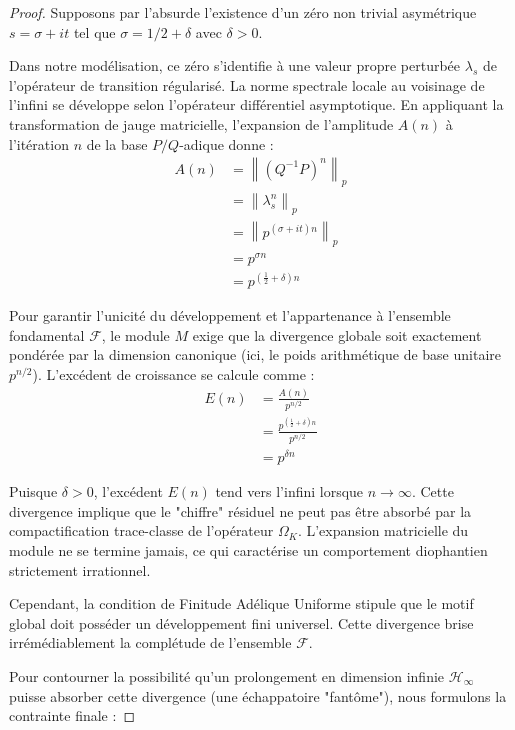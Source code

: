 \documentclass[
]{article}
\begin{document}
\begin{proof}
Supposons par l'absurde l'existence d'un zéro non trivial asymétrique $s = \sigma + it$ tel que $\sigma = 1/2 + \delta$ avec $\delta > 0$.

Dans notre modélisation, ce zéro s'identifie à une valeur propre perturbée $\lambda_s$ de l'opérateur de transition régularisé. La norme spectrale locale au voisinage de l'infini se développe selon l'opérateur différentiel asymptotique. En appliquant la transformation de jauge matricielle, l'expansion de l'amplitude $A(n)$ à l'itération $n$ de la base $P/Q$-adique donne :
\begin{align*}
    A(n) &= \left\| (Q^{-1}P)^n \right\|_p \\
    &= \left\| \lambda_s^n \right\|_p \\
    &= \left\| p^{(\sigma + it)n} \right\|_p \\
    &= p^{\sigma n} \\
    &= p^{(\frac{1}{2} + \delta)n}
\end{align*}

Pour garantir l'unicité du développement et l'appartenance à l'ensemble fondamental $\mathcal{F}$, le module $M$ exige que la divergence globale soit exactement pondérée par la dimension canonique (ici, le poids arithmétique de base unitaire $p^{n/2}$). L'excédent de croissance se calcule comme :
\begin{align*}
    E(n) &= \frac{A(n)}{p^{n/2}} \\
    &= \frac{p^{(\frac{1}{2} + \delta)n}}{p^{n/2}} \\
    &= p^{\delta n}
\end{align*}

Puisque $\delta > 0$, l'excédent $E(n)$ tend vers l'infini lorsque $n \to \infty$. Cette divergence implique que le "chiffre" résiduel ne peut pas être absorbé par la compactification trace-classe de l'opérateur $\Omega_K$. L'expansion matricielle du module ne se termine jamais, ce qui caractérise un comportement diophantien strictement irrationnel.

Cependant, la condition de Finitude Adélique Uniforme stipule que le motif global doit posséder un développement fini universel. Cette divergence brise irrémédiablement la complétude de l'ensemble $\mathcal{F}$.

Pour contourner la possibilité qu'un prolongement en dimension infinie $\mathcal{H}_{\infty}$ puisse absorber cette divergence (une échappatoire "fantôme"), nous formulons la contrainte finale :


\end{proof}
\end{document}
